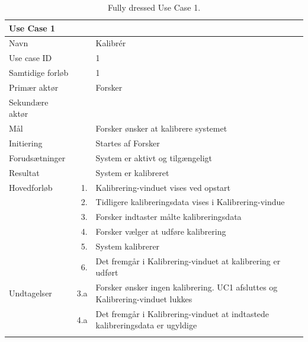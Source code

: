\begin{longtabu} to  %
    {\large \textbf{Use Case 1}} && \\
    \toprule
    Navn &&    Kalibrér\\
    Use case ID &&    1\\
    Samtidige forløb &&    1\\
    Primær aktør &&    Forsker\\
    Sekundære aktør &&	 \\
    Mål &&    Forsker ønsker at kalibrere systemet\\
    Initiering &&	Startes af Forsker\\
    Forudsætninger &&  System er aktivt og tilgængeligt\\
    Resultat &&		System er kalibreret                         \\ \midrule
    Hovedforløb &    1. &	 Kalibrering-vinduet vises ved opstart\\[-1ex]  				
    			&    2. &    Tidligere kalibreringsdata vises i Kalibrering-vindue\\[-1ex]
    			&	 3. &	 Forsker indtaster målte kalibreringsdata
    			\\
    			&    4.	&	 Forsker vælger at udføre kalibrering\\
                &    5.	&	 System kalibrerer\\
                &	 6. &	 Det fremgår i Kalibrering-vinduet at kalibrering er udført \newline\\ \midrule
                
    Undtagelser &    3.a &   Forsker ønsker ingen kalibrering. UC1 afsluttes og Kalibrering-vinduet lukkes  \\
    			&	 4.a &	 Det fremgår i Kalibrering-vinduet at indtastede kalibreringsdata er ugyldige \\ \bottomrule
\caption{Fully dressed Use Case 1.}
\label{UC1}
\end{longtabu}


